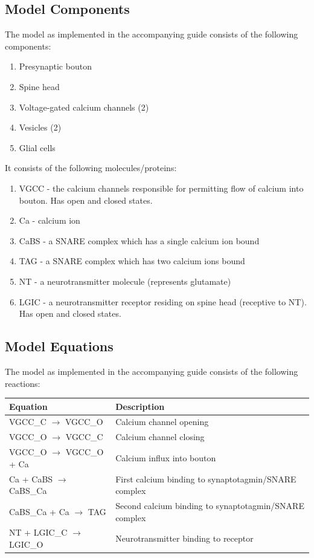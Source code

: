 \documentclass[a4paper]{article}
\begin{document}
\subsection{Model Components}
The model as implemented in the accompanying guide consists of the following components:
\begin{enumerate} 
    \item Presynaptic bouton
    \item Spine head
    \item Voltage-gated calcium channels (2)
    \item Vesicles (2)
    \item Glial cells
\end{enumerate}

It consists of the following molecules/proteins:
\begin{enumerate}
    \item VGCC - the calcium channels responsible for permitting flow of calcium into bouton. Has open and closed states.
    \item Ca - calcium ion
    \item CaBS - a SNARE complex which has a single calcium ion bound
    \item TAG - a SNARE complex which has two calcium ions bound
    \item NT - a neurotransmitter molecule (represents glutamate)
    \item LGIC - a neurotransmitter receptor residing on spine head (receptive to NT). Has open and closed states.
\end{enumerate}

\subsection{Model Equations}
The model as implemented in the accompanying guide consists of the following reactions:
\begin{table}[H]
\begin{tabular}{ll}
Equation & Description \\ \hline
VGCC\_C $\to$ VGCC\_O & Calcium channel opening \\
VGCC\_O $\to$ VGCC\_C & Calcium channel closing \\
VGCC\_O $\to$ VGCC\_O + Ca & Calcium influx into bouton \\
Ca + CaBS $\to$ CaBS\_Ca & First calcium binding to synaptotagmin/SNARE complex  \\ 
CaBS\_Ca + Ca $\to$ TAG & Second calcium binding to synaptotagmin/SNARE complex  \\
NT + LGIC\_C $\to$ LGIC\_O& Neurotransmitter binding to receptor \\
\end{tabular} 
\end{table}
\end{document}
